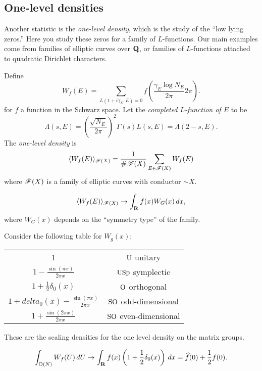 \subsection{One-level densities}

Another statistic is the \emph{one-level density}, which is the study of the 
``low lying zeros.'' Here you study these zeros for a family of $L$-functions. 
Our main examples come from families of elliptic curves over $\mathbf{Q}$, or 
families of $L$-functions attached to quadratic Dirichlet characters. 

Define 
\[
  W_f(E) = \sum_{L(1+i\gamma_E,E) = 0} f\left(\frac{\gamma_E\log N_E}{2\pi}{2\pi}\right) .
\]
for $f$ a function in the Schwarz space. Let the 
\emph{completed $L$-function of $E$} to be 
\[
  \Lambda(s,E) = \left(\frac{\sqrt{N_E}}{2\pi}\right)^2 \Gamma(s) L(s,E) = \Lambda(2-s,E) .
\]
The \emph{one-level density} is 
\[
  \langle W_f(E)\rangle_{\mathscr{F}(X)} = \frac{1}{\# \mathscr{F}(X)} \sum_{E\in \mathscr{F}(X)}W_f(E) 
\]
where $\mathscr{F}(X)$ is a family of elliptic curves with conductor $\sim X$. 

\begin{conjecture}
\[
  \langle W_f(E)\rangle_{\mathscr{F}(X)}  \to \int_{\mathbf{R}} f(x) W_G(x)\, dx ,
\]
where $W_G(x)$ depends on the ``symmetry type'' of the family. 
\end{conjecture}

Consider the following table for $W_g(x)$:
\begin{center}
\begin{tabular}{c|c}
  1 & $\operatorname{U}$ unitary \\
  $1-\frac{\sin(\pi x)}{2\pi x}$ & $\operatorname{USp}$ symplectic \\
  $1+\frac 1 2 \delta_0(x)$ & $\operatorname{O}$ orthogonal \\
  $1+delta_0(x)-\frac{\sin(\pi x)}{2\pi x}$ & $\operatorname{SO}$ odd-dimensional \\
  $1+\frac{\sin(2\pi x)}{2\pi x}$ & $\operatorname{SO}$ even-dimensional
\end{tabular}
\end{center}

These are the scaling densities for the one level density on the matrix groups. 

\begin{theorem}
\[
  \int_{\operatorname{O}(N)} W_f(U)\, dU \to \int_{\mathbf{R}} f(x) \left(1+\frac 1 2 \delta_0(x)\right)\, dx = \widehat f(0) + \frac 1 2 f(0) .
\]
\end{theorem}

